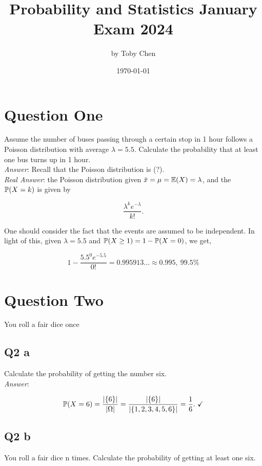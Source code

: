 \documentclass{article}
\title{Probability and Statistics January Exam 2024}
\author{by Toby Chen}
\date{\today}
\begin{document}
    \maketitle

    \tableofcontents

    \section{Question One}
        Assume the number of buses passing through a certain stop in 1 hour follows a Poisson distribution with average $\lambda= 5.5$. Calculate the probability that at least one bus turns up in 1 hour.\\

        \textit{Answer}: Recall that the Poisson distribution is (?). \xmark\\

        \textit{Real Answer}: the Poisson distribution given $\bar{x} = \mu = \mathbb{E}(X) = \lambda$, and the $\mathbb{P}(X = k)$ is given by

        \[\frac{\lambda^ke^{-\lambda}}{k!}.\]

        One should consider the fact that the events are assumed to be independent. In light of this, given $\lambda = 5.5$ and $\mathbb{P}(X \geq 1) = 1 - \mathbb{P}(X = 0)$, we get,

        \[1 - \frac{5.5^0 e^{-5.5}}{0!} = 0.995913... \approx 0.995,~ 99.5\%\]

    \section{Question Two}
        You roll a fair dice once

        \subsection{Q2 a}
            Calculate the probability of getting the number six.\\

            \textit{Answer}:

            \[\mathbb{P}(X = 6) = \frac{|\{6\}|}{|\Omega|} = \frac{|\{6\}|}{|\{1,2,3,4,5,6\}|} = \frac{1}{6}.~\checkmark\]

        \subsection{Q2 b}
            You roll a fair dice n times. Calculate the probability of getting at least one six.\\
\end{document}
